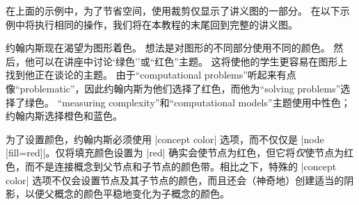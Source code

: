 
在上面的示例中，为了节省空间，使用裁剪仅显示了讲义图的一部分。 在以下示例中将执行相同的操作，我们将在本教程的末尾回到完整的讲义图。


约翰内斯现在渴望为图形着色。 想法是对图形的不同部分使用不同的颜色。 然后，他可以在讲座中讨论`绿色''或``红色''主题。 这将使他的学生更容易在图形上找到他正在谈论的主题。 由于``computational problems''听起来有点像``problematic''，因此约翰内斯为他们选择了红色，而他为``solving problems''选择了绿色。 ``measuring complexity''和``computational models''主题使用中性色；约翰内斯选择橙色和蓝色。


为了设置颜色，约翰内斯必须使用 |concept color| 选项，而不仅仅是 |node [fill=red]|。仅将填充颜色设置为 |red| 确实会使节点为红色，但它将\emph{仅}使节点为红色，而不是连接概念到父节点和子节点的颜色带。相比之下，特殊的 |concept color| 选项不仅会设置节点及其子节点的颜色，而且还会（神奇地）创建适当的阴影，以便父概念的颜色平稳地变化为子概念的颜色。


